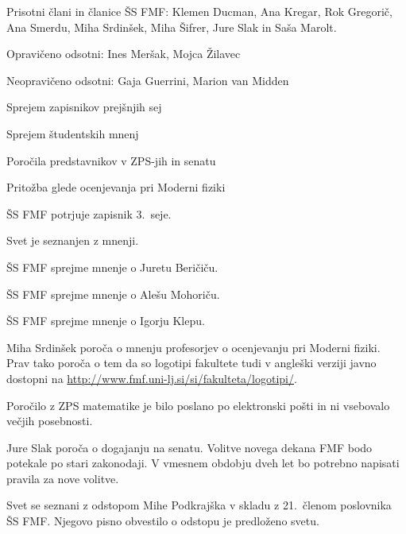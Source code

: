 \documentclass{seja}
\begin{document}
Prisotni člani in članice ŠS FMF: Klemen Ducman, Ana Kregar, Rok Gregorič, Ana
Smerdu, Miha Srdinšek, Miha Šifrer, Jure Slak in Saša Marolt.

Opravičeno odsotni: Ines Meršak, Mojca Žilavec

Neopravičeno odsotni: Gaja Guerrini, Marion van Midden

\begin{red*}
\item Sprejem zapisnikov prejšnjih sej
\item Sprejem študentskih mnenj
\item Poročila predstavnikov v ZPS-jih in senatu
\item Pritožba glede ocenjevanja pri Moderni fiziki
\end{red*}

\begin{ad}
\item
\begin{sklep*}
  ŠS FMF potrjuje zapisnik 3.~seje.
\end{sklep*}

\item
Svet je seznanjen z mnenji.

\begin{sklep*} ŠS FMF sprejme mnenje o Juretu Beričiču.  \end{sklep*}
\begin{sklep*} ŠS FMF sprejme mnenje o Alešu Mohoriču. \end{sklep*}
\begin{sklep*} ŠS FMF sprejme mnenje o Igorju Klepu. \end{sklep*}

\item Miha Srdinšek poroča o mnenju profesorjev o ocenjevanju pri Moderni fiziki.
Prav tako poroča o tem da so logotipi fakultete tudi v angleški verziji javno dostopni na
\url{http://www.fmf.uni-lj.si/si/fakulteta/logotipi/}.

Poročilo z ZPS matematike je bilo poslano po elektronski pošti in ni vsebovalo večjih posebnosti.

Jure Slak poroča o dogajanju na senatu. Volitve novega dekana FMF bodo potekale po stari zakonodaji.
V vmesnem obdobju dveh let bo potrebno napisati pravila za nove volitve.

\item Svet se seznani z odstopom Mihe Podkrajška v skladu z 21.~členom poslovnika ŠS FMF.
Njegovo pisno obvestilo o odstopu je predloženo svetu.


\end{ad}
\end{document}
